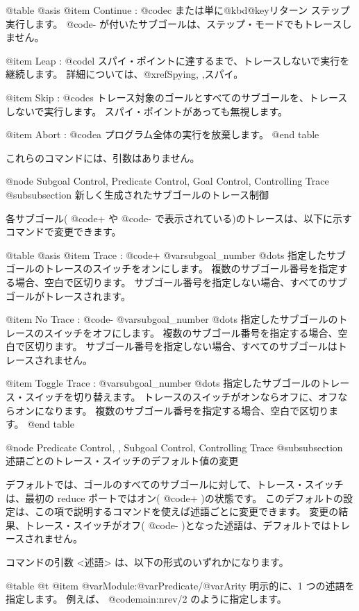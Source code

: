 {{{{@table @asis
@item  Continue : @code{c} または単に@kbd{@key{リターン}}
ステップ実行します。
 @code{-} が付いたサブゴールは、ステップ・モードでもトレースしません。

@item Leap : @code{l}
スパイ・ポイントに達するまで、トレースしないで実行を継続します。
詳細については、@xref{Spying, ,スパイ}。

@item Skip : @code{s}
トレース対象のゴールとすべてのサブゴールを、トレースしないで実行します。
スパイ・ポイントがあっても無視します。

@item Abort : @code{a}
プログラム全体の実行を放棄します。
@end table

これらのコマンドには、引数はありません。

@node Subgoal Control, Predicate Control, Goal Control, Controlling Trace
@subsubsection 新しく生成されたサブゴールのトレース制御

各サブゴール( @code{+} や @code{-} で表示されている)のトレースは、以下に示すコマンドで変更できます。

@table @asis
@item Trace : @code{+} @var{subgoal_number} @dots{}
指定したサブゴールのトレースのスイッチをオンにします。
複数のサブゴール番号を指定する場合、空白で区切ります。
サブゴール番号を指定しない場合、すべてのサブゴールがトレースされます。

@item No Trace : @code{-} @var{subgoal_number} @dots{}
指定したサブゴールのトレースのスイッチをオフにします。
複数のサブゴール番号を指定する場合、空白で区切ります。
サブゴール番号を指定しない場合、すべてのサブゴールはトレースされません。

@item Toggle Trace : @var{subgoal_number} @dots{}
指定したサブゴールのトレース・スイッチを切り替えます。
トレースのスイッチがオンならオフに、オフならオンになります。
複数のサブゴール番号を指定する場合、空白で区切ります。
@end table

@node Predicate Control,  , Subgoal Control, Controlling Trace
@subsubsection 述語ごとのトレース・スイッチのデフォルト値の変更

デフォルトでは、ゴールのすべてのサブゴールに対して、トレース・スイッチは、最初の reduce ポートではオン( @code{+} )の状態です。
このデフォルトの設定は、この項で説明するコマンドを使えば述語ごとに変更できます。
変更の結果、トレース・スイッチがオフ( @code{-} )となった述語は、デフォルトではトレースされません。

コマンドの引数 <述語> は、以下の形式のいずれかになります。

@table @t
@item @var{Module}:@var{Predicate}/@var{Arity}
明示的に、1 つの述語を指定します。
例えば、 @code{main:nrev/2} のように指定します。

}}}}
